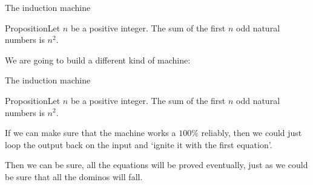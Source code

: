 \documentclass{beamer}
\def\bl[#1]#2{\begin{block}{#1}#2\end{block}}
\begin{document}
\begin{frame}{The induction machine}
\bl[Proposition]{Let $n$ be a positive integer. The sum of the first $n$ odd natural numbers is $n^2$.}
\center We are going to build a different kind of machine:
\begin{figure}
\flushleft
{}
\end{figure}
\end{frame}

\begin{frame}{The induction machine}
\bl[Proposition]{Let $n$ be a positive integer. The sum of the first $n$ odd natural numbers is $n^2$.}
If we can make sure that the machine works a $100\%$ reliably, then we could just loop the output back on the input and `ignite it with the first equation'.
\begin{figure}
\centering
{}
\end{figure}
Then we can be sure, all the equations will be proved eventually, just as we could be sure that all the dominos will fall.
\end{frame}
\end{document}
